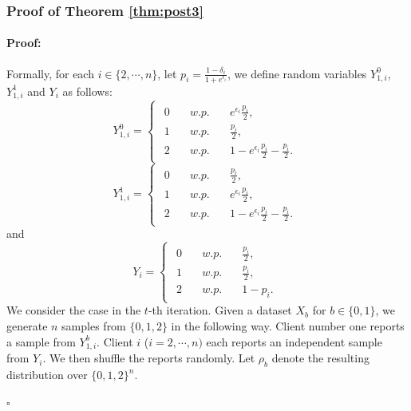 \documentclass[letterpaper]{article} %
\newenvironment{proof}{\paragraph{Proof:}}{\hfill$\square$}
\begin{document}
\subsubsection{Proof of Theorem \ref{thm:post3}}
\begin{proof}
Formally, for each $i \in \{ 2, \cdots, n\}$, let $p_i =  \frac{1-\delta_i}{1+e^{\epsilon_i}}$, we
define random variables $Y_{1,i}^0$, $Y_{1,i}^1$ and $Y_i$ as follows:
\begin{equation}
Y_{1,i}^0 =
\begin{cases}
    \begin{array}{lll}
        0 &  \quad w.p. &\quad e^{\epsilon_i}\frac{p_i}{2}, \\
        1 &  \quad w.p. &\quad \frac{p_i}{2}, \\
        2 &  \quad w.p. &\quad  1-e^{\epsilon_i}\frac{p_i}{2}-\frac{p_i}{2}.
    \end{array}
\end{cases}
\end{equation}
\begin{equation}
Y_{1,i}^1 =
\begin{cases}
    \begin{array}{lll}
        0 &  \quad w.p. &\quad \frac{p_i}{2}, \\
        1 &  \quad w.p. &\quad e^{\epsilon_i}\frac{p_i}{2}, \\
        2 &  \quad w.p. &\quad  1-e^{\epsilon_i}\frac{p_i}{2}-\frac{p_i}{2}.
    \end{array}
\end{cases}
\end{equation}
and
\begin{equation}
Y_i =
\begin{cases}
    \begin{array}{lll}
        0 &  \quad w.p. &\quad \frac{p_i}{2}, \\
        1 &  \quad w.p. &\quad \frac{p_i}{2}, \\
        2 &  \quad w.p. &\quad  1-p_i.
    \end{array}
\end{cases}
\end{equation}
We consider the case in the $t$-th iteration. Given a dataset $X_b$ for $b \in \{0,1\}$, we generate $n$ samples from $\{0,1,2\}$ in the following way. Client number one reports a sample from $Y_{1,i}^b$. Client $i$ ($i=2,\cdots, n)$ each reports an independent sample from $Y_i$. We then shuffle the reports randomly. Let $\rho_b$ denote the resulting distribution over $\{0,1,2\}^n$.

\end{proof}
\end{document}
